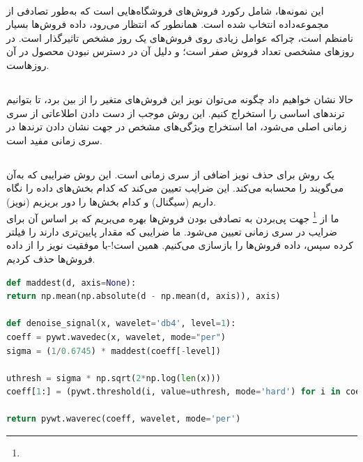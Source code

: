 \documentclass{article}
\begin{document}
\ \\
این نمونه‌ها، شامل رکورد فروش‌های فروشگاه‌هایی است که به‌طور تصادفی از مجموعه‌داده انتخاب شده است. همانطور که انتظار می‌رود، داده فروش‌ها بسیار نامنظم است، چراکه عوامل زیادی روی فروش‌های یک روز مشخص تاثیرگذار است. در روزهای مشخصی تعداد فروش‌ صفر است؛ و دلیل آن در دسترس نبودن محصول در آن روز‌هاست.
\subsection*{}
حالا نشان خواهیم داد چگونه می‌توان نویز این فروش‌های متغیر را از بین برد، تا بتوانیم ترند‌های اساسی را استخراج کنیم. این روش موجب از دست دادن اطلاعاتی از سری‌ زمانی اصلی می‌شود، اما استخراج ویژگی‌های مشخص در جهت نشان دادن ترند‌ها در سری‌ زمانی مفید است.
\subsection*{}
 یک روش برای حذف نویز اضافی از سری‌ زمانی است. این روش ضرایبی که به‌آن  می‌گویند را محسابه می‌کند. این ضرایب تعیین می‌کند که کدام بخش‌های داده را نگاه داریم (سیگنال) و کدام بخش‌ها را دور بریزیم (نویز).\\
 ما از 
 \footnote{} 
 جهت پی‌بردن به تصادفی بودن فروش‌ها بهره می‌بریم که بر اساس آن 
 برای ضرایب در سری‌ زمانی تعیین می‌شود. ما ضرایبی که مقدار پایین‌تری دارند را فیلتر کرده سپس، داده فروش‌ها را بازسازی می‌کنیم. همین است!-با موفقیت نویز را از داده فروش‌ها حذف کردیم. 
\begin{latin}
\begin{lstlisting}[language=Python]
def maddest(d, axis=None):
return np.mean(np.absolute(d - np.mean(d, axis)), axis)

def denoise_signal(x, wavelet='db4', level=1):
coeff = pywt.wavedec(x, wavelet, mode="per")
sigma = (1/0.6745) * maddest(coeff[-level])

uthresh = sigma * np.sqrt(2*np.log(len(x)))
coeff[1:] = (pywt.threshold(i, value=uthresh, mode='hard') for i in coeff[1:])

return pywt.waverec(coeff, wavelet, mode='per')
\end{lstlisting}
\end{latin}
\end{document}
